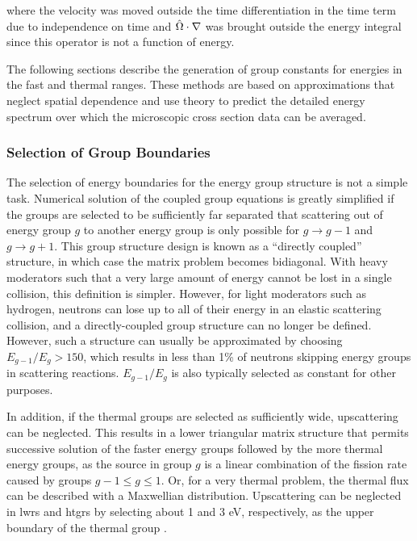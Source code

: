 where the velocity was moved outside the time differentiation in the time term due to independence on time and \(\hat{\Omega}\cdot\nabla\) was brought outside the energy integral since this operator is not a function of energy. 

The following sections describe the generation of group constants for energies in the fast and thermal ranges. These methods are based on approximations that neglect spatial dependence and use theory to predict the detailed energy spectrum over which the microscopic cross section data can be averaged.

\subsubsection{Selection of Group Boundaries}

The selection of energy boundaries for the energy group structure is not a simple task. Numerical solution of the coupled group equations is greatly simplified if the groups are selected to be sufficiently far separated that scattering out of energy group \(g\) to another energy group is only possible for \(g\rightarrow g-1\) and \(g\rightarrow g+1\). This group structure design is known as a ``directly coupled'' structure, in which case the matrix problem becomes bidiagonal. With heavy moderators such that a very large amount of energy cannot be lost in a single collision, this definition is simpler. However, for light moderators such as hydrogen, neutrons can lose up to all of their energy in an elastic scattering collision, and a directly-coupled group structure can no longer be defined. However, such a structure can usually be approximated by choosing \(E_{g-1}/E_g>150\), which results in less than 1\% of neutrons skipping energy groups in scattering reactions. \(E_{g-1}/E_g\) is also typically selected as constant for other purposes.

In addition, if the thermal groups are selected as sufficiently wide, upscattering can be neglected. This results in a lower triangular matrix structure that permits successive solution of the faster energy groups followed by the more thermal energy groups, as the source in group \(g\) is a linear combination of the fission rate caused by groups \(g-1\leq g\leq 1\). Or, for a very thermal problem, the thermal flux can be described with a Maxwellian distribution. Upscattering can be neglected in \glspl{lwr} and \glspl{htgr} by selecting about 1 and 3 eV, respectively, as the upper boundary of the thermal group \cite{duderstadt}.

